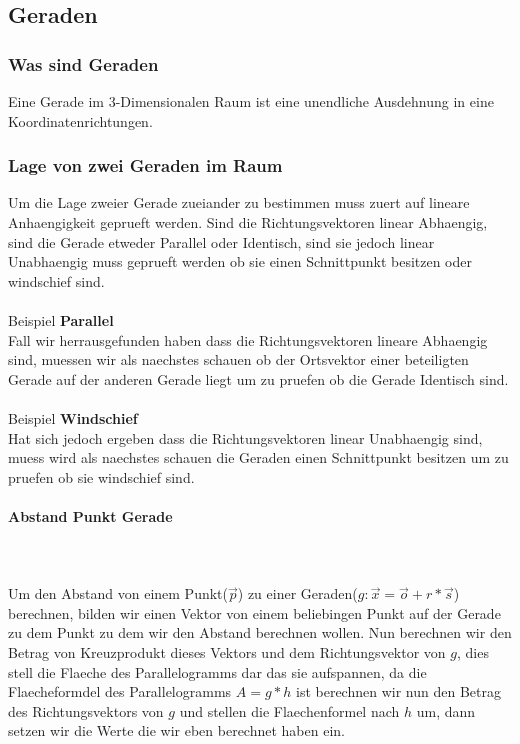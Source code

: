 \documentclass[a4paper]{article} %
\begin{document}
	\subsection{Geraden}
	\subsubsection{Was sind Geraden}
	Eine Gerade im 3-Dimensionalen Raum ist eine unendliche Ausdehnung in eine Koordinatenrichtungen.
	\subsubsection{Lage von zwei Geraden im Raum}
	Um die Lage zweier Gerade zueiander zu bestimmen muss zuert auf lineare Anhaengigkeit geprueft werden.
	Sind die Richtungsvektoren linear Abhaengig, sind die Gerade etweder Parallel oder Identisch, sind sie jedoch linear Unabhaengig
	muss geprueft werden ob sie einen Schnittpunkt besitzen oder windschief sind.
	\\\\Beispiel \textbf{Parallel}
	\\Fall wir herrausgefunden haben dass die Richtungsvektoren lineare Abhaengig sind, muessen wir als naechstes schauen ob der Ortsvektor einer beteiligten Gerade auf der anderen Gerade liegt um zu pruefen ob die Gerade Identisch sind.
	\\\\Beispiel \textbf{Windschief}
	\\Hat sich jedoch ergeben dass die Richtungsvektoren linear  Unabhaengig sind, muess wird als naechstes schauen die Geraden einen Schnittpunkt besitzen um zu pruefen ob sie windschief sind.
	\paragraph{Abstand Punkt Gerade}
	\hspace{0 cm} \\ \noindent \\
	Um den Abstand von einem Punkt($\vec{p}$) zu einer Geraden($g: \vec{x}=\vec{o}+r*\vec{s}$) berechnen, bilden wir einen Vektor von einem beliebingen Punkt auf der Gerade zu dem Punkt zu dem wir den Abstand berechnen wollen. Nun berechnen wir den Betrag von Kreuzprodukt dieses Vektors und dem Richtungsvektor von $g$, dies stell die Flaeche des Parallelogramms dar das sie aufspannen,
	da die Flaecheformdel des Parallelogramms $A=g*h$ ist berechnen wir nun den Betrag des Richtungsvektors von $g$ und stellen die Flaechenformel nach $h$ um, dann setzen wir die Werte die wir eben berechnet haben ein.
\end{document}
